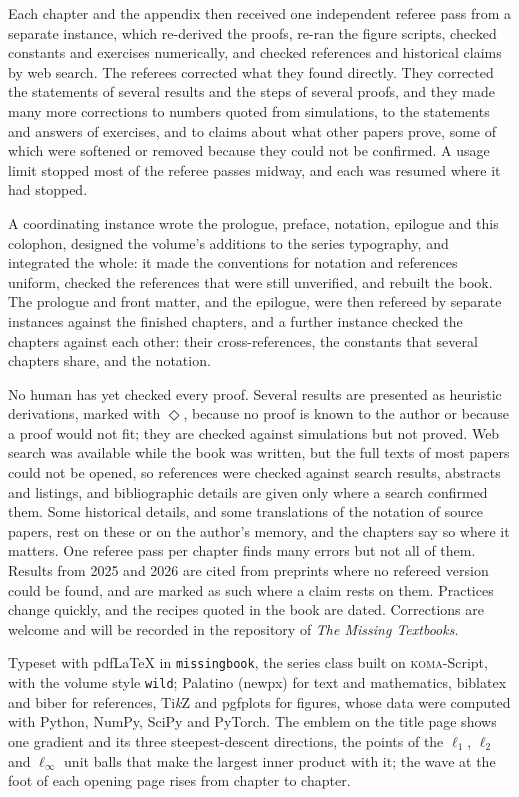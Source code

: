 Each chapter and the appendix then received one independent referee pass from a separate instance, which re-derived the proofs, re-ran the figure scripts, checked constants and exercises numerically, and checked references and historical claims by web search. The referees corrected what they found directly. They corrected the statements of several results and the steps of several proofs, and they made many more corrections to numbers quoted from simulations, to the statements and answers of exercises, and to claims about what other papers prove, some of which were softened or removed because they could not be confirmed. A usage limit stopped most of the referee passes midway, and each was resumed where it had stopped.

A coordinating instance wrote the prologue, preface, notation, epilogue and this colophon, designed the volume's additions to the series typography, and integrated the whole: it made the conventions for notation and references uniform, checked the references that were still unverified, and rebuilt the book. The prologue and front matter, and the epilogue, were then refereed by separate instances against the finished chapters, and a further instance checked the chapters against each other: their cross-references, the constants that several chapters share, and the notation.


No human has yet checked every proof. Several results are presented as heuristic derivations, marked with $\Diamond$, because no proof is known to the author or because a proof would not fit; they are checked against simulations but not proved. Web search was available while the book was written, but the full texts of most papers could not be opened, so references were checked against search results, abstracts and listings, and bibliographic details are given only where a search confirmed them. Some historical details, and some translations of the notation of source papers, rest on these or on the author's memory, and the chapters say so where it matters. One referee pass per chapter finds many errors but not all of them. Results from 2025 and 2026 are cited from preprints where no refereed version could be found, and are marked as such where a claim rests on them. Practices change quickly, and the recipes quoted in the book are dated. Corrections are welcome and will be recorded in the repository of \emph{The Missing Textbooks}.

\medskip
{\small\noindent Typeset with pdf\LaTeX{} in \texttt{missingbook}, the series class built on \textsc{koma}-Script, with the volume style \texttt{wild}; Palatino (newpx) for text and mathematics, biblatex and biber for references, Ti\emph{k}Z and pgfplots for figures, whose data were computed with Python, NumPy, SciPy and PyTorch. The emblem on the title page shows one gradient and its three steepest-descent directions, the points of the $\ell_1$, $\ell_2$ and $\ell_\infty$ unit balls that make the largest inner product with it; the wave at the foot of each opening page rises from chapter to chapter.\par}
